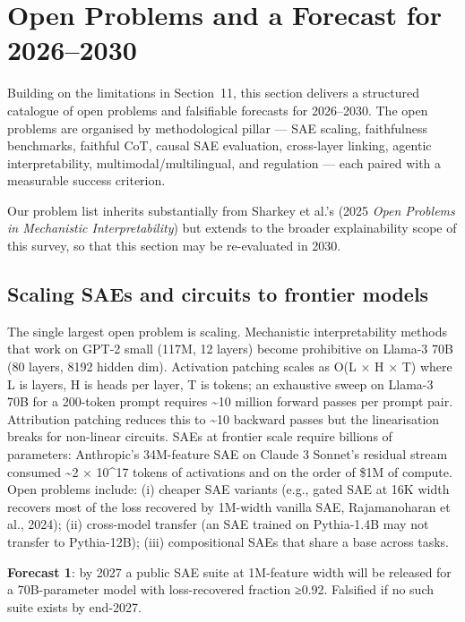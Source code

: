 \documentclass{article}
\begin{document}
\section{Open Problems and a Forecast for 2026--2030}\label{open-problems-and-a-forecast-for-20262030}

Building on the limitations in Section~11, this section delivers a structured catalogue of open problems and falsifiable forecasts for 2026--2030. The open problems are organised by methodological pillar --- SAE scaling, faithfulness benchmarks, faithful CoT, causal SAE evaluation, cross-layer linking, agentic interpretability, multimodal/multilingual, and regulation --- each paired with a measurable success criterion.

Our problem list inherits substantially from Sharkey et al.'s (2025 \emph{Open Problems in Mechanistic Interpretability}) but extends to the broader explainability scope of this survey, so that this section may be re-evaluated in 2030.

\subsection{Scaling SAEs and circuits to frontier models}\label{scaling-saes-and-circuits-to-frontier-models}

The single largest open problem is scaling. Mechanistic interpretability methods that work on GPT-2 small (117M, 12 layers) become prohibitive on Llama-3 70B (80 layers, 8192 hidden dim). Activation patching scales as O(L × H × T) where L is layers, H is heads per layer, T is tokens; an exhaustive sweep on Llama-3 70B for a 200-token prompt requires \textasciitilde10 million forward passes per prompt pair. Attribution patching \citep{syed2024attributionpatchin} reduces this to \textasciitilde10 backward passes but the linearisation breaks for non-linear circuits. SAEs at frontier scale require billions of parameters: Anthropic's 34M-feature SAE on Claude 3 Sonnet's residual stream consumed \textasciitilde2 × 10\^{}17 tokens of activations and on the order of \$1M of compute. Open problems include: (i) cheaper SAE variants (e.g., gated SAE at 16K width recovers most of the loss recovered by 1M-width vanilla SAE, Rajamanoharan et al., 2024); (ii) cross-model transfer (an SAE trained on Pythia-1.4B may not transfer to Pythia-12B); (iii) compositional SAEs that share a base across tasks.

\textbf{Forecast 1}: by 2027 a public SAE suite at 1M-feature width will be released for a 70B-parameter model with loss-recovered fraction ≥0.92. Falsified if no such suite exists by end-2027.
\end{document}
